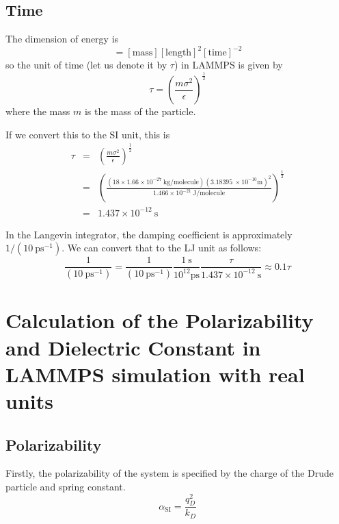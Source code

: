 \documentclass[aps, 12pt, amsmath, amssymb, onecolumn, notitlepage, nofootinbib]{revtex4-1}
\begin{document}
\subsection{Time}

The dimension of energy is 
\begin{equation}
[\text{energy}] = [\text{mass}][\text{length}]^2[\text{time}]^{-2}
\end{equation}
so the unit of time (let us denote it by $\tau$) in LAMMPS is given by
\begin{equation}
\tau = \left(\frac{m \sigma^2}{\epsilon}\right)^\frac{1}{2} 
\label{tau}
\end{equation}
where the mass $m$ is the mass of the particle.

If we convert this to the SI unit, this is
\begin{eqnarray}
\tau &=&  \left(\frac{m \sigma^2}{\epsilon}\right)^\frac{1}{2} \nonumber\\
&=& \left(\frac{(18 \times 1.66 \times 10^{-27}\ \text{kg/molecule} ) (3.18395\ \times 10^{-10} \text{m})^2}{1.466 \times 10^{-21}\ \text{J/molecule} }\right)^\frac{1}{2} \nonumber\\
&=& 1.437 \times 10^{-12}\ \text{s} 
\end{eqnarray}

In the Langevin integrator, the damping coefficient is approximately $1/(10\ \text{ps}^{-1})$. We can convert that to the LJ unit as follows:
\begin{equation}
\frac{1}{(10\ \text{ps}^{-1})} = \frac{1}{(10\ \text{ps}^{-1})} \frac{1\ \text{s}}{10^{12} \text{ps}}  \frac{\tau}{ 1.437 \times 10^{-12}\ \text{s}} \approx 0.1 \tau 
\end{equation}
%


\section{Calculation of the Polarizability and Dielectric Constant in LAMMPS simulation with real units}

\subsection{Polarizability}

Firstly, the polarizability of the system is specified by the charge of the Drude particle and spring constant.
\begin{equation}
\alpha_\text{SI} = \frac{q_D^2}{k_D} 
\end{equation}
\end{document}
